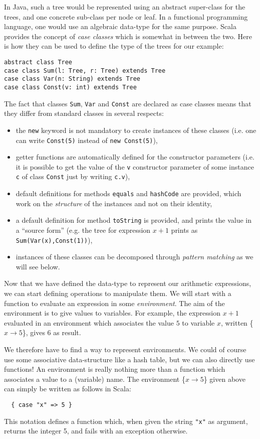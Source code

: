 \documentclass[a4paper,11pt,twoside,titlepage]{article}
\begin{document}
In Java, such a tree would be represented using an abstract
super-class for the trees, and one concrete sub-class per node or
leaf. In a functional programming language, one would use an algebraic
data-type for the same purpose. Scala provides the concept of
\emph{case classes} which is somewhat in between the two. Here is how
they can be used to define the type of the trees for our example:
\begin{lstlisting}
abstract class Tree
case class Sum(l: Tree, r: Tree) extends Tree
case class Var(n: String) extends Tree
case class Const(v: int) extends Tree
\end{lstlisting}
The fact that classes \lstinline?Sum?, \lstinline?Var? and \lstinline?Const? are
declared as case classes means that they differ from standard classes
in several respects:
\begin{itemize}
\item the \lstinline?new? keyword is not mandatory to create instances of
  these classes (i.e. one can write \lstinline?Const(5)? instead of
  \lstinline?new Const(5)?),
\item getter functions are automatically defined for the constructor
  parameters (i.e. it is possible to get the value of the \lstinline?v?
  constructor parameter of some instance \lstinline?c? of class
  \lstinline?Const? just by writing \lstinline?c.v?),
\item default definitions for methods \lstinline?equals? and
  \lstinline?hashCode? are provided, which work on the \emph{structure} of
  the instances and not on their identity,
\item a default definition for method \lstinline?toString? is provided, and
  prints the value in a ``source form'' (e.g. the tree for expression
  $x+1$ prints as \lstinline?Sum(Var(x),Const(1))?),
\item instances of these classes can be decomposed through
  \emph{pattern matching} as we will see below.
\end{itemize}

Now that we have defined the data-type to represent our arithmetic
expressions, we can start defining operations to manipulate them. We
will start with a function to evaluate an expression in some
\emph{environment}. The aim of the environment is to give values to
variables. For example, the expression $x+1$ evaluated in an
environment which associates the value $5$ to variable $x$, written
\{$x\rightarrow 5$\}, gives $6$ as result.

We therefore have to find a way to represent environments. We could of
course use some associative data-structure like a hash table, but we
can also directly use functions! An environment is really nothing more
than a function which associates a value to a (variable) name. The
environment \{$x\rightarrow 5$\} given above can simply be written as
follows in Scala:
\begin{lstlisting}
  { case "x" => 5 }
\end{lstlisting}
This notation defines a function which, when given the string
\lstinline?"x"? as argument, returns the integer 5, and fails with an
exception otherwise.
\end{document}
